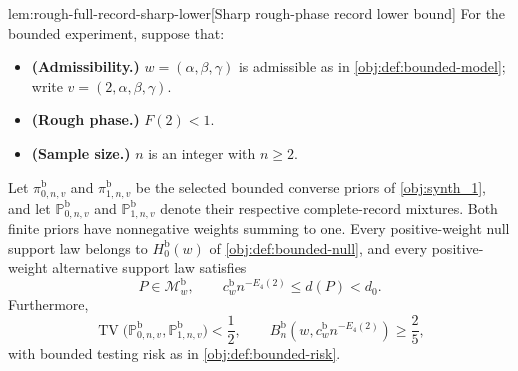 \documentclass[11pt]{article}
\begin{document}
\begin{lemmav}{lem:rough-full-record-sharp-lower}[Sharp rough-phase record lower bound]
For the bounded experiment, suppose that:
\begin{itemize}
\item \textbf{(Admissibility.)} \(w=(\alpha,\beta,\gamma)\) is admissible as in \cref{obj:def:bounded-model}; write \(v=(2,\alpha,\beta,\gamma)\).
\item \textbf{(Rough phase.)} \(F(2)<1\).
\item \textbf{(Sample size.)} \(n\) is an integer with \(n\ge2\).
\end{itemize}
Let \(\pi^{\mathrm b}_{0,n,v}\) and \(\pi^{\mathrm b}_{1,n,v}\) be the selected bounded converse priors of \cref{obj:synth_1}, and let
\(\mathbb P^{\mathrm b}_{0,n,v}\) and \(\mathbb P^{\mathrm b}_{1,n,v}\) denote their respective complete-record mixtures. Both finite priors have nonnegative weights summing to one. Every positive-weight null support law belongs to \(H_0^{\mathrm b}(w)\) of \cref{obj:def:bounded-null}, and every positive-weight alternative support law satisfies
\[
P\in\mathcal M^{\mathrm b}_w,
\qquad
c_w^{\mathrm b}n^{-E_4(2)}\le d(P)<d_0.
\]
Furthermore,
\[
\operatorname{TV}
\bigl(\mathbb P^{\mathrm b}_{0,n,v},\mathbb P^{\mathrm b}_{1,n,v}\bigr)
<\frac12,
\qquad
B_n^{\mathrm b}\!\left(w,c_w^{\mathrm b}n^{-E_4(2)}\right)\ge\frac25,
\]
with bounded testing risk as in \cref{obj:def:bounded-risk}.
\end{lemmav}
\end{document}
